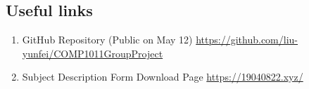 \documentclass[manuscript,screen,review,12pt]{acmart}
\begin{document}
\subsection{Useful links}
\begin{enumerate}
    \item GitHub Repository (Public on May 12) \url{https://github.com/liu-yunfei/COMP1011GroupProject}
    \item Subject Description Form Download Page \url{https://19040822.xyz/}

\end{enumerate}


\end{document}
